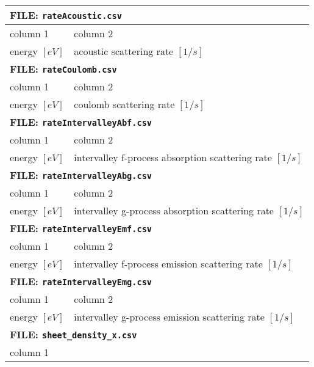 \begin{table}[ht!]
\centering
\begin{tabular}{|m{3.5cm}|m{3.5cm}|m{3.5cm}|m{3.5cm}|m{3.5cm}|}
\hline
  \multicolumn{5}{|l|}{\textbf{FILE: \texttt{rateAcoustic.csv}}} \\
\hline
  column 1 & \multicolumn{4}{|l|}{column 2}  \\
\hline \hline
  energy $[eV]$ & \multicolumn{4}{|l|}{acoustic scattering rate $[1/s]$} \\
\hline
  \multicolumn{5}{|l|}{\textbf{FILE: \texttt{rateCoulomb.csv}}} \\
\hline
  column 1 & \multicolumn{4}{|l|}{column 2}  \\
\hline
  energy $[eV]$ &  \multicolumn{4}{|l|}{coulomb scattering rate $[1/s]$} \\
\hline
  \multicolumn{5}{|l|}{\textbf{FILE: \texttt{rateIntervalleyAbf.csv}}} \\
\hline
  column 1 & \multicolumn{4}{|l|}{column 2}  \\
\hline
  energy $[eV]$ & \multicolumn{4}{|l|}{intervalley f-process absorption scattering rate $[1/s]$}  \\
\hline \hline
  \multicolumn{5}{|l|}{\textbf{FILE: \texttt{rateIntervalleyAbg.csv}}} \\
\hline
  column 1 & \multicolumn{4}{|l|}{column 2}  \\
\hline
  energy $[eV]$ & \multicolumn{4}{|l|}{intervalley g-process absorption scattering rate $[1/s]$} \\
\hline \hline
  \multicolumn{5}{|l|}{\textbf{FILE: \texttt{rateIntervalleyEmf.csv}}} \\
\hline
  column 1 & \multicolumn{4}{|l|}{column 2}  \\
\hline
  energy $[eV]$ & \multicolumn{4}{|l|}{intervalley f-process emission scattering rate $[1/s]$} \\
\hline \hline
  \multicolumn{5}{|l|}{\textbf{FILE: \texttt{rateIntervalleyEmg.csv}}} \\
\hline
  column 1 & \multicolumn{4}{|l|}{column 2}  \\
\hline
  energy $[eV]$ & \multicolumn{4}{|l|}{intervalley g-process emission scattering rate $[1/s]$} \\
\hline \hline
  \multicolumn{5}{|l|}{\textbf{FILE: \texttt{sheet\_density\_x.csv}}} \\
\hline
  \multicolumn{5}{|l|}{column 1}  \\
\hline

\end{tabular}
\end{table}
